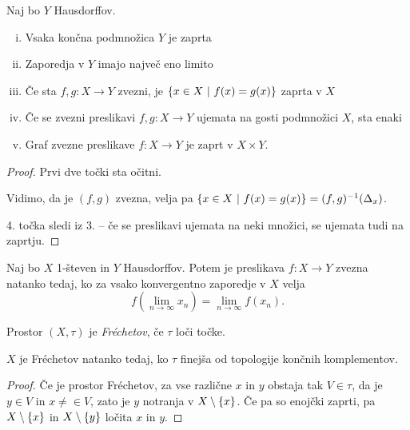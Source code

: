 \begin{izrek}
Naj bo $Y$ Hausdorffov.

\begin{enumerate}[i)]
\item Vsaka končna podmnožica $Y$ je zaprta
\item Zaporedja v $Y$ imajo največ eno limito
\item Če sta $f, g \colon X \to Y$ zvezni, je
$\left\{x \in X~\middle\vert~f(x) = g(x)\right\}$ zaprta v $X$
\item Če se zvezni preslikavi $f, g \colon X \to Y$ ujemata na
gosti podmnožici $X$, sta enaki
\item Graf zvezne preslikave $f \colon X \to Y$ je zaprt v
$X \times Y$.
\end{enumerate}
\end{izrek}

\begin{proof}
Prvi dve točki sta očitni.

Vidimo, da je $(f,g)$ zvezna, velja pa
$\left\{x \in X~\middle\vert~f(x) = g(x)\right\} = (f,g)^{-1}(\Delta_x)$.

4. točka sledi iz 3. -- če se preslikavi ujemata na neki množici,
se ujemata tudi na zaprtju.
%
\end{proof}

\begin{izrek}
Naj bo $X$ 1-števen in $Y$ Hausdorffov. Potem je preslikava
$f \colon X \to Y$ zvezna natanko tedaj, ko za vsako konvergentno
zaporedje v $X$ velja
\[
f\left(\lim_{n\to\infty} x_n\right) = \lim_{n\to\infty} f(x_n).
\]
\end{izrek}


\begin{definicija}
Prostor $(X, \tau)$ je
\emph{Fréchetov}, če $\tau$
loči točke.
\end{definicija}

\begin{trditev}
$X$ je Fréchetov natanko tedaj, ko $\tau$ finejša od topologije
končnih komplementov.
\end{trditev}

\begin{proof}
Če je prostor Fréchetov, za vse različne $x$ in $y$ obstaja tak
$V \in \tau$, da je $y \in V$ in $x \ne \in V$, zato je $y$
notranja v $X \setminus \left\{x\right\}$. Če pa so enojčki zaprti, pa
$X \setminus \left\{x\right\}$ in $X \setminus \left\{y\right\}$ ločita $x$ in $y$.
\end{proof}

